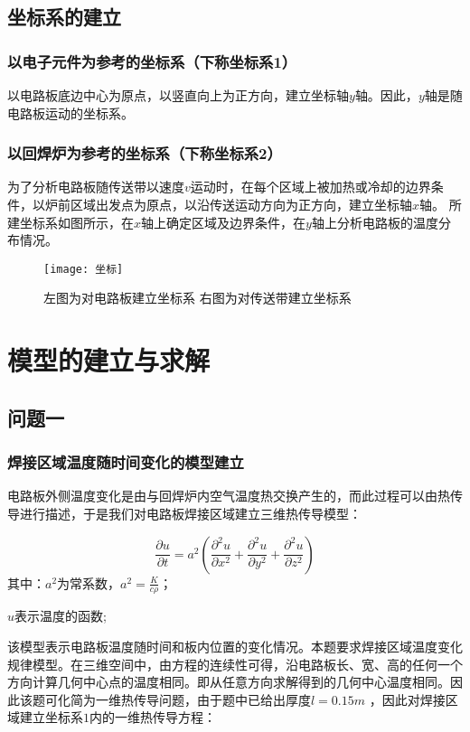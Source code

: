 \documentclass[withoutpreface,bwprint]{cumcmthesis} %
\numberwithin{equation}{subsection}
\begin{document}
\subsection{坐标系的建立}
\subsubsection{以电子元件为参考的坐标系（下称坐标系1）}
以电路板底边中心为原点，以竖直向上为正方向，建立坐标轴$y$轴。因此，$y$轴是随电路板运动的坐标系。
\subsubsection{以回焊炉为参考的坐标系（下称坐标系2）}
为了分析电路板随传送带以速度$v$运动时，在每个区域上被加热或冷却的边界条件，以炉前区域出发点为原点，以沿传送运动方向为正方向，建立坐标轴$x$轴。
所建坐标系如图所示，在$𝑥$轴上确定区域及边界条件，在$y$轴上分析电路板的温度分布情况。



\begin{figure}[!h]
	\centering
	\texttt{[image: 坐标]}
	\caption{左图为对电路板建立坐标系 \quad   右图为对传送带建立坐标系}
	\label{fig:x_y}
\end{figure}

\section{模型的建立与求解}

\subsection{问题一}

\subsubsection{焊接区域温度随时间变化的模型建立}
电路板外侧温度变化是由与回焊炉内空气温度热交换产生的，而此过程可以由热传导进行描述，于是我们对电路板焊接区域建立三维热传导模型\cite{yangshimin2006}：

$$
\frac{\partial u}{\partial t}=a^{2}\left(\frac{\partial^{2} u}{\partial x^{2}}+\frac{\partial^{2} u}{\partial y^{2}}+\frac{\partial^{2} u}{\partial z^{2}}\right)
$$
其中：$a^2$为常系数，$a^2= \frac{K}{c\rho}$；

$u$表示温度的函数;

该模型表示电路板温度随时间和板内位置的变化情况。本题要求焊接区域温度变化规律模型。在三维空间中，由方程的连续性可得，沿电路板长、宽、高的任何一个方向计算几何中心点的温度相同。即从任意方向求解得到的几何中心温度相同。因此该题可化简为一维热传导问题，由于题中已给出厚度$𝑙=0.15𝑚$ ，因此对焊接区域建立坐标系$1$内的一维热传导方程\cite{yangshimin2006}：
\end{document}
